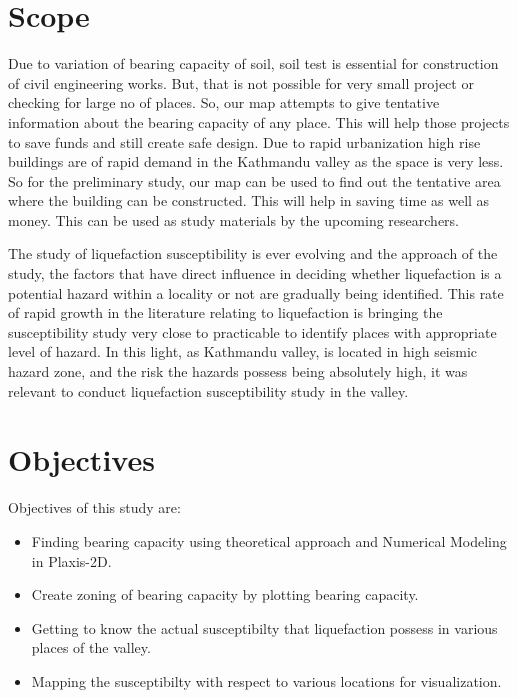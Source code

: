  \section{Scope}
Due to variation of bearing capacity of soil, soil test is essential for construction of civil engineering works. But, that is not possible for very small project or checking for large no of places. So, our map attempts to give tentative information about the bearing capacity of any place. This will help those projects to save funds and still create safe design. Due to rapid urbanization high rise buildings are of rapid demand in the Kathmandu valley as the space is very less. So for the preliminary study, our map can be used to find out the tentative area where the building can be constructed. This will help in saving time as well as money. This can be used as study materials by the upcoming researchers. 
 
The study of liquefaction susceptibility is ever evolving and the approach of the study, the factors that have direct influence in deciding whether liquefaction is a potential hazard within a locality or not are gradually being identified. This rate of rapid growth in the literature relating to liquefaction is bringing the susceptibility study very close to  practicable to identify places with appropriate level of hazard. In this light, as Kathmandu valley, is located in high seismic hazard zone, and the risk the hazards possess being absolutely high, it was relevant to conduct liquefaction susceptibility study in the valley. 
 
\section{Objectives}
Objectives of this study are:
\begin{itemize}
  \item	Finding bearing capacity using theoretical approach and Numerical Modeling in Plaxis-2D.
  \item	Create zoning of bearing capacity by plotting bearing capacity.
  \item	Getting to know the actual susceptibilty that liquefaction possess in various places of the valley.
  \item	Mapping the susceptibilty with respect to various locations for visualization.  
\end{itemize}

